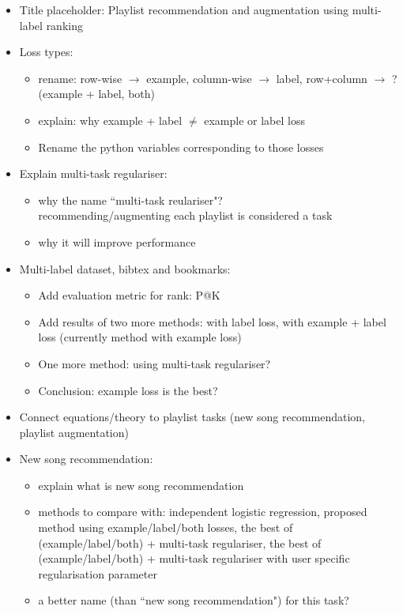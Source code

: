 \TODO

\begin{itemize}
\item Title placeholder: Playlist recommendation and augmentation using multi-label ranking \DONE

\item Loss types: 
      \begin{itemize}
      \item rename:  row-wise $\to$ example, column-wise $\to$ label, row+column $\to$ ? (example + label, both)
      \item explain: why example + label $\ne$ example or label loss
      \item Rename the python variables corresponding to those losses \DONE
      \end{itemize}
\item Explain multi-task regulariser:
      \begin{itemize}
      \item why the name ``multi-task reulariser"? \\
            recommending/augmenting each playlist is considered a task
      \item why it will improve performance
      \end{itemize}
\item Multi-label dataset, \ie bibtex and bookmarks:
      \begin{itemize}
      \item Add evaluation metric for rank: \eg P@K
      \item Add results of two more methods: with label loss, with example + label loss (currently method with example loss)
      \item One more method: using multi-task regulariser?
      \item Conclusion: example loss is the best?
      \end{itemize}

\item Connect equations/theory to playlist tasks (new song recommendation, playlist augmentation)

\item New song recommendation:
      \begin{itemize}
      \item explain what is new song recommendation
      \item methods to compare with: independent logistic regression, proposed method using example/label/both losses, 
            the best of (example/label/both) + multi-task regulariser, 
            the best of (example/label/both) + multi-task regulariser with user specific regularisation parameter
      \item a better name (than ``new song recommendation") for this task?
      \end{itemize}


\end{itemize}
